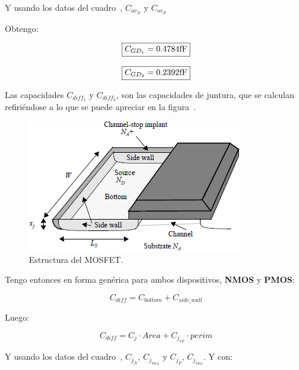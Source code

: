 Y usando los datos del cuadro~, $C_{ov_{N}}$ y $C_{ov_{P}}$

Obtengo:


\begin{equation*}
\boxed{ C_{GD_{1}} = 0.4784 \si[per-mode=symbol]{\femto\farad} }
\end{equation*}


\begin{equation*}
\boxed{ C_{GD_{2}} = 0.2392 \si[per-mode=symbol]{\femto\farad} }
\end{equation*}


Las capacidades $C_{diff_{1}}$ y $C_{diff_{2}}$, son las capacidades de juntura, que se calculan refiriéndose a lo que se puede apreciar en la figura~.



\begin{figure}[H] %
\begin{center}
\includegraphics[width=0.7 \textwidth, angle=0]{./img/point1/mosfet_structure}
\caption{\label{fig:fig_mosfet_structure}\footnotesize{Estructura del MOSFET.}}
\end{center}
\end{figure}



Tengo entonces en forma genérica para ambos dispositivos, \textbf{NMOS} y \textbf{PMOS}:

\begin{equation*}
C_{diff} = C_{bottom} + C_{side\_wall}
\end{equation*}

Luego:

\begin{equation*}
C_{diff} = C_{j} \cdot Area + C_{j_{sw}} \cdot perim
\end{equation*}


Y usando los datos del cuadro~, $C_{j_{N}}$, $C_{j_{sw_{N}}}$ y $C_{j_{P}}$, $C_{j_{sw_{P}}}$. Y con:

